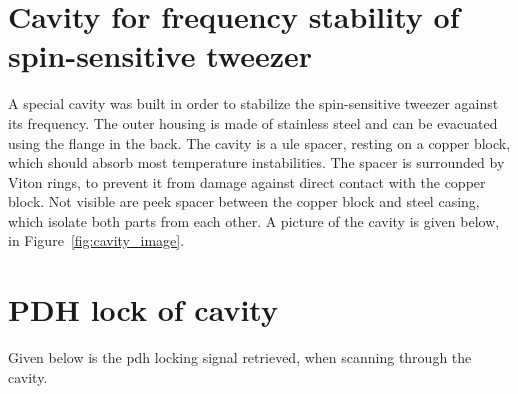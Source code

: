 \appendix
\chapter{Cavity for frequency stability of spin-sensitive tweezer}%
\label{ch:app_cavity}

A special cavity was built in order to stabilize the spin-sensitive tweezer against its frequency. The outer housing is made of stainless steel and can be evacuated using the flange in the back. The cavity is a \ac{ule} spacer, resting on a copper block, which should absorb most temperature instabilities. The spacer is surrounded by Viton rings, to prevent it from damage against direct contact with the copper block. Not visible are peek spacer between the copper block and steel casing, which isolate both parts from each other. A picture of the cavity is given below, in Figure~\ref{fig:cavity_image}.

\begin{figure}[h!]%
\end{figure}

\chapter{PDH lock of cavity}%
\label{ch:app_pdh}

Given below is the \ac{pdh} locking signal retrieved, when scanning through the cavity.

\begin{figure}[h!]%
\end{figure}
